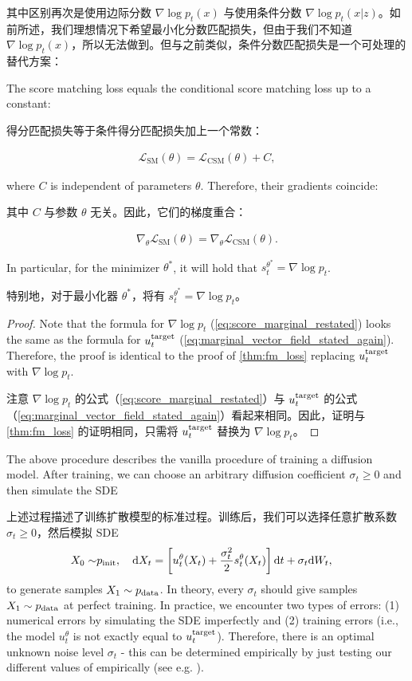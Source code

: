 其中区别再次是使用边际分数 $\nabla\log p_t(x)$ 与使用条件分数 $\nabla\log p_t(x|z)$。如前所述，我们理想情况下希望最小化分数匹配损失，但由于我们不知道 $\nabla\log p_t(x)$，所以无法做到。但与之前类似，条件分数匹配损失是一个可处理的替代方案：
\begin{theorem}
\label{thm:dsm_loss}
The score matching loss equals the conditional score matching loss up to a constant:

得分匹配损失等于条件得分匹配损失加上一个常数：

\begin{align*}
\mathcal{L}_{\text{SM}}(\theta) = \mathcal{L}_{\text{CSM}}(\theta) + C,
\end{align*}

where $C$ is independent of parameters $\theta$. Therefore, their gradients coincide:

其中 $C$ 与参数 $\theta$ 无关。因此，它们的梯度重合：

\begin{align*}
\nabla_\theta \mathcal{L}_{\text{SM}}(\theta) = \nabla_\theta \mathcal{L}_{\text{CSM}}(\theta).
\end{align*}

In particular, for the minimizer $\theta^*$, it will hold that $s_t^{\theta^*}=\nabla\log p_t$. 

特别地，对于最小化器 $\theta^*$，将有 $s_t^{\theta^*}=\nabla\log p_t$。
\end{theorem}
\begin{proof}
Note that the formula for $\nabla\log p_t$ (\cref{eq:score_marginal_restated}) looks the same as the formula for $u^{\text{target}}_t$ (\cref{eq:marginal_vector_field_stated_again}). Therefore, the proof is identical to the proof of \cref{thm:fm_loss} replacing $u^{\text{target}}_t$ with $\nabla\log p_t$.

注意 $\nabla\log p_t$ 的公式（\cref{eq:score_marginal_restated}）与 $u^{\text{target}}_t$ 的公式（\cref{eq:marginal_vector_field_stated_again}）看起来相同。因此，证明与 \cref{thm:fm_loss} 的证明相同，只需将 $u^{\text{target}}_t$ 替换为 $\nabla\log p_t$。
\end{proof}

The above procedure describes the vanilla procedure of training a diffusion model. After training, we can choose an arbitrary diffusion coefficient $\sigma_t\geq 0$ and then simulate the SDE

上述过程描述了训练扩散模型的标准过程。训练后，我们可以选择任意扩散系数 $\sigma_t\geq 0$，然后模拟 SDE
\begin{align}
\label{eq:sde_extension_restated}
    X_0\sim&p_{\rm{init}},\quad \mathrm{d} X_t =\left[u_t^\theta(X_t)+\frac{\sigma_t^2}{2}s_t^\theta(X_t)\right]\mathrm{d} t +\sigma_t\mathrm{d} W_t,
\end{align}
to generate samples $X_1\sim p_{\rm{data}}$. In theory, every $\sigma_t$ should give samples $X_1\sim p_{\rm{data}}$ at perfect training. In practice, we encounter two types of errors: (1) numerical errors by simulating the SDE imperfectly and (2) training errors (i.e., the model $u_t^{\theta}$ is not exactly equal to $u^{\text{target}}_t$). Therefore, there is an optimal unknown noise level $\sigma_t$ - this can be determined empirically by just testing our different values of empirically (see e.g. \citep{albergo2023stochastic,karras2022elucidating,ma2024sit}).

